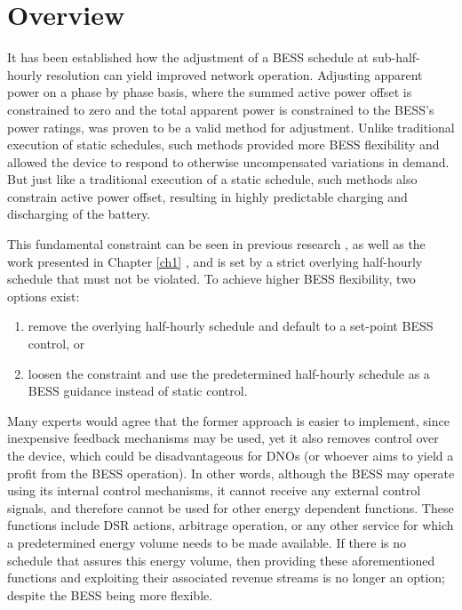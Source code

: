 \section{Overview}
\label{ch2:sec:overview}

It has been established how the adjustment of a BESS schedule at sub-half-hourly resolution can yield improved network operation.
Adjusting apparent power on a phase by phase basis, where the summed active power offset is constrained to zero and the total apparent power is constrained to the BESS's power ratings, was proven to be a valid method for adjustment.
Unlike traditional execution of static schedules, such methods provided more BESS flexibility and allowed the device to respond to otherwise uncompensated variations in demand.
But just like a traditional execution of a static schedule, such methods also constrain active power offset, resulting in highly predictable charging and discharging of the battery.

This fundamental constraint can be seen in previous research \cite{Rowe2014a, Yunusov2011}, as well as the work presented in Chapter \ref{ch1} \cite{Zangs2016}, and is set by a strict overlying half-hourly schedule that must not be violated.
To achieve higher BESS flexibility, two options exist:

\begin{enumerate}
	\item remove the overlying half-hourly schedule and default to a set-point BESS control, or
	\item loosen the constraint and use the predetermined half-hourly schedule as a BESS guidance instead of static control.
\end{enumerate}

Many experts would agree that the former approach is easier to implement, since inexpensive feedback mechanisms may be used, yet it also removes control over the device, which could be disadvantageous for DNOs (or whoever aims to yield a profit from the BESS operation).
In other words, although the BESS may operate using its internal control mechanisms, it cannot receive any external control signals, and therefore cannot be used for other energy dependent functions.
These functions include DSR actions, arbitrage operation, or any other service for which a predetermined energy volume needs to be made available.
If there is no schedule that assures this energy volume, then providing these aforementioned functions and exploiting their associated revenue streams is no longer an option; despite the BESS being more flexible.

